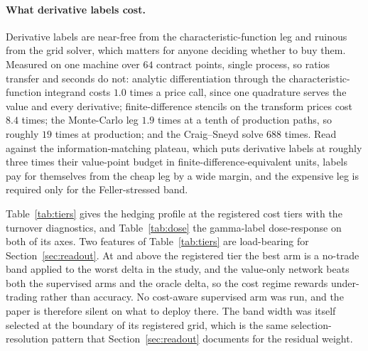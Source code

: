 \documentclass{article}
\begin{document}
\paragraph{What derivative labels cost.} Derivative labels are near-free from the
characteristic-function leg and ruinous from the grid solver, which matters for
anyone deciding whether to buy them. Measured on one machine over $64$ contract
points, single process, so ratios transfer and seconds do not: analytic
differentiation through the characteristic-function integrand costs $1.0$ times a
price call, since one quadrature serves the value and every derivative;
finite-difference stencils on the transform prices cost $8.4$ times; the
Monte-Carlo leg $1.9$ times at a tenth of production paths, so roughly $19$ times at
production; and the Craig--Sneyd solve $688$ times. Read against the
information-matching plateau, which puts derivative labels at roughly three times
their value-point budget in finite-difference-equivalent units, labels pay for
themselves from the cheap leg by a wide margin, and the expensive leg is required
only for the Feller-stressed band.


Table~\ref{tab:tiers} gives the hedging profile at the registered cost tiers with
the turnover diagnostics, and Table~\ref{tab:dose} the gamma-label dose-response on
both of its axes. Two features of Table~\ref{tab:tiers} are load-bearing for
Section~\ref{sec:readout}. At and above the registered tier the best arm is a
no-trade band applied to the worst delta in the study, and the value-only network
beats both the supervised arms and the oracle delta, so the cost regime rewards
under-trading rather than accuracy. No cost-aware supervised arm was run, and the
paper is therefore silent on what to deploy there. The band width was itself
selected at the boundary of its registered grid, which is the same
selection-resolution pattern that Section~\ref{sec:readout} documents for the
residual weight.
\end{document}
